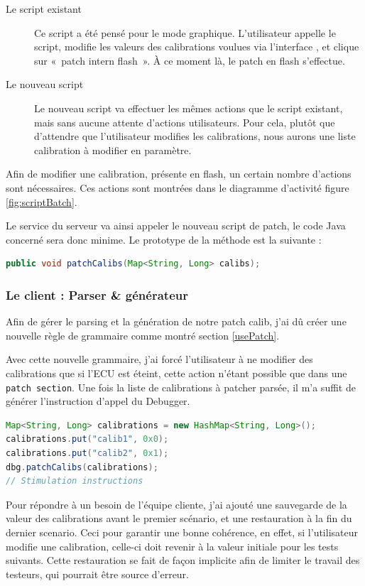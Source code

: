 	\begin{description}
		\item[Le script existant] Ce script a été pensé pour le mode graphique. L'utilisateur appelle le script, modifie les valeurs des calibrations voulues via l'interface , et clique sur «~patch intern flash~». À ce moment là, le patch en flash s'effectue.
		\item[Le nouveau script] Le nouveau script va effectuer les mêmes actions que le script existant, mais sans aucune attente d'actions utilisateurs. Pour cela, plutôt que d'attendre que l'utilisateur modifies les calibrations, nous aurons une liste calibration à modifier en paramètre.
	\end{description}

	Afin de modifier une calibration, présente en flash, un certain nombre d'actions sont nécessaires. Ces actions sont montrées dans le diagramme d'activité figure \ref{fig:scriptBatch}.
	
	Le service du serveur va ainsi appeler le nouveau script de patch, le code Java concerné sera donc minime. Le prototype de la méthode est la suivante : 
	\begin{lstlisting}[language=Java, numbers=none]
public void patchCalibs(Map<String, Long> calibs);
	\end{lstlisting}

	\subsubsection{Le client : Parser \& générateur}
	Afin de gérer le parsing et la génération de notre patch calib, j'ai dû créer une nouvelle règle de grammaire comme montré section \ref{usePatch}. 
	
	Avec cette nouvelle grammaire, j'ai forcé l'utilisateur à ne modifier des calibrations que si l'ECU est éteint, cette action n'étant possible que dans une \texttt{patch section}. Une fois la liste de calibrations à patcher parsée, il m'a suffit de générer l'instruction d'appel du Debugger.
	
	\begin{lstlisting}[language=Java]
Map<String, Long> calibrations = new HashMap<String, Long>();
calibrations.put("calib1", 0x0);
calibrations.put("calib2", 0x1);
dbg.patchCalibs(calibrations);
// Stimulation instructions
	\end{lstlisting}
	
	Pour répondre à un besoin de l'équipe cliente, j'ai ajouté une sauvegarde de la valeur des calibrations avant le premier scénario, et une restauration à la fin du dernier scenario. Ceci pour garantir une bonne cohérence, en effet, si l'utilisateur modifie une calibration, celle-ci doit revenir à la valeur initiale pour les tests suivants. Cette restauration se fait de façon implicite afin de limiter le travail des testeurs, qui pourrait être source d'erreur.
	
